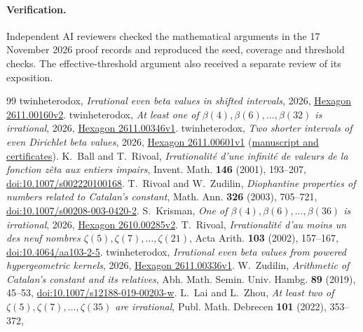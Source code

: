 \documentclass[11pt]{article}
\numberwithin{equation}{section}
\begin{document}
\paragraph{Verification.}
Independent AI reviewers checked the mathematical arguments in the
17 November 2026 proof records and reproduced the seed, coverage and
threshold checks. The effective-threshold argument also received a
separate review of its exposition.

\begin{thebibliography}{99}
\small
{}
twinheterodox, \emph{Irrational even beta values in shifted intervals},
2026, \href{https://hexagonmath.org/2611.00160v2}{Hexagon 2611.00160v2}.
twinheterodox, \emph{At least one of \(\beta(4),\beta(6),\ldots,\beta(32)\)
is irrational}, 2026,
\href{https://hexagonmath.org/2611.00346v1}{Hexagon 2611.00346v1}.
twinheterodox, \emph{Two shorter intervals of even Dirichlet beta values},
2026, \href{https://hexagonmath.org/2611.00601v1}{Hexagon 2611.00601v1}
(\href{https://github.com/twinheterodox/beta4/tree/main/beta-intervals}{manuscript and certificates}).
K.~Ball and T.~Rivoal, \emph{Irrationalit\'e d'une infinit\'e de valeurs de la
fonction z\^eta aux entiers impairs}, Invent. Math. \textbf{146} (2001),
193--207, \href{https://doi.org/10.1007/s002220100168}{doi:10.1007/s002220100168}.
T.~Rivoal and W.~Zudilin, \emph{Diophantine properties of numbers related to
Catalan's constant}, Math. Ann. \textbf{326} (2003), 705--721,
\href{https://doi.org/10.1007/s00208-003-0420-2}{doi:10.1007/s00208-003-0420-2}.
S.~Krisman, \emph{One of \(\beta(4),\beta(6),\ldots,\beta(36)\) is irrational},
2026, \href{https://hexagonmath.org/2610.00285v2}{Hexagon 2610.00285v2}.
T.~Rivoal, \emph{Irrationalit\'e d'au moins un des neuf nombres
\(\zeta(5),\zeta(7),\ldots,\zeta(21)\)}, Acta Arith. \textbf{103}
(2002), 157--167, \href{https://doi.org/10.4064/aa103-2-5}{doi:10.4064/aa103-2-5}.
twinheterodox, \emph{Irrational even beta values from powered hypergeometric
kernels}, 2026, \href{https://hexagonmath.org/2611.00336v1}{Hexagon 2611.00336v1}.
W.~Zudilin, \emph{Arithmetic of Catalan's constant and its relatives},
Abh. Math. Semin. Univ. Hambg. \textbf{89} (2019), 45--53,
\href{https://doi.org/10.1007/s12188-019-00203-w}{doi:10.1007/s12188-019-00203-w}.
L.~Lai and L.~Zhou, \emph{At least two of \(\zeta(5),\zeta(7),\ldots,\zeta(35)\)
are irrational}, Publ. Math. Debrecen \textbf{101} (2022), 353--372,

\end{thebibliography}
\end{document}
